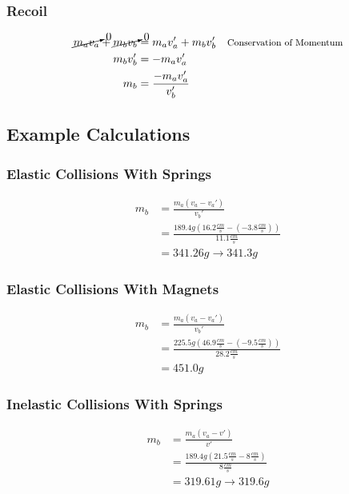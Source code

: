 \documentclass[12pt]{article}
\begin{document}
\subsubsection{Recoil}
\begin{equation}
    \begin{aligned}
        \cancelto{0}{m_av_a}+\cancelto{0}{m_bv_b}&=m_av_a'+m_bv_b' & \text{\footnotesize{Conservation of Momentum}} \\
        m_bv_b'&=-m_av_a' \\
        m_b&=\frac{-m_av_a'}{v_b'}
    \end{aligned}
\end{equation}
\subsection{Example Calculations}
\subsubsection{Elastic Collisions With Springs}
\begin{equation}
    \begin{aligned}
        m_b&=\frac{m_a(v_a-v_a')}{v_b'} \\
        &=\frac{189.4g(16.2\frac{cm}{s}-(-3.8\frac{cm}{s}))}{11.1\frac{cm}{s}} \\
        &=341.26g\rightarrow341.3g
    \end{aligned}
\end{equation}
\subsubsection{Elastic Collisions With Magnets}
\begin{equation}
    \begin{aligned}
        m_b&=\frac{m_a(v_a-v_a')}{v_b'} \\
        &=\frac{225.5g(46.9\frac{cm}{s}-(-9.5\frac{cm}{s}))}{28.2\frac{cm}{s}} \\
        &=451.0g
    \end{aligned}
\end{equation}
\subsubsection{Inelastic Collisions With Springs}
\begin{equation}
    \begin{aligned}
        m_b&=\frac{m_a(v_a-v')}{v'} \\
        &=\frac{189.4g(21.5\frac{cm}{s}-8\frac{cm}{s})}{8\frac{cm}{s}} \\
        &=319.61g\rightarrow319.6g
    \end{aligned}
\end{equation}
\end{document}
